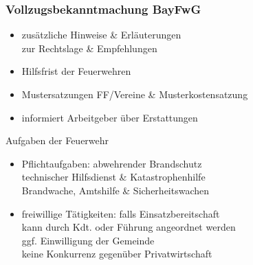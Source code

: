 \begin{normbox}{\subsubsection{Vollzugsbekanntmachung BayFwG}}
    \begin{itemize}
        \item zusätzliche Hinweise \& Erläuterungen\\
        \ra zur Rechtslage \& Empfehlungen
        \item Hilfsfrist der Feuerwehren
        \item Mustersatzungen FF/Vereine \& Musterkostensatzung
        \item informiert Arbeitgeber über Erstattungen
    \end{itemize}
\end{normbox}
\begin{sectionbox}{Aufgaben der Feuerwehr}
    \begin{itemize}
        \item Pflichtaufgaben: abwehrender Brandschutz\\
        \ra technischer Hilfsdienst \& Katastrophenhilfe\\
        \ra Brandwache, Amtshilfe \& Sicherheitswachen
        \item freiwillige Tätigkeiten: falls Einsatzbereitschaft\\
        \ra kann durch Kdt. oder Führung angeordnet werden\\
        \ra ggf. Einwilligung der Gemeinde\\
        \ra keine Konkurrenz gegenüber Privatwirtschaft 
    \end{itemize}
\end{sectionbox}
